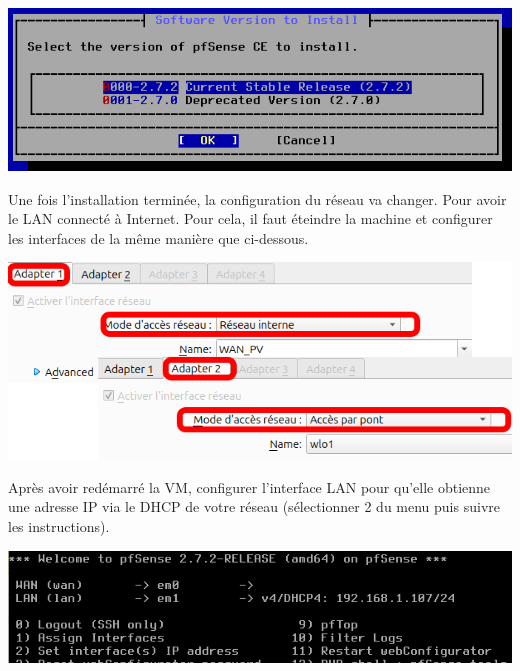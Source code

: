 \documentclass[french, 12pt]{article}%
\begin{document}
\begin{center}
\includegraphics[scale=0.5]{./ressource/VM_network7.png}
\end{center}

Une fois l'installation terminée, la configuration du réseau va changer. Pour avoir le LAN connecté à Internet. Pour cela, il faut éteindre la machine et configurer les interfaces de la même manière que ci-dessous. 

\begin{center}
\includegraphics[scale=0.7]{./ressource/VM_finReseau0}
\end{center}
 
 Après avoir redémarré la VM, configurer l'interface LAN pour qu'elle obtienne une adresse IP via le DHCP de votre réseau (sélectionner 2 du menu puis suivre les instructions).  

\begin{center}
\includegraphics[scale=0.7]{./ressource/VM_finReseau1}
\end{center}
\end{document}
